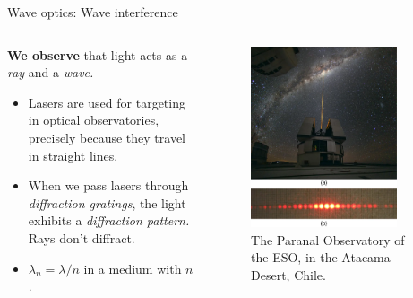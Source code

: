 \documentclass{beamer}
\begin{document}
\begin{frame}{Wave optics: Wave interference}
\begin{columns}[T]
\begin{column}{0.5\textwidth}
\small
\textbf{We observe} that light acts as a \textit{ray} and a \textit{wave.}
\begin{itemize}
\item Lasers are used for targeting in optical observatories, precisely because they travel in straight lines.
\item When we pass lasers through \textit{diffraction gratings}, the light exhibits a \textit{diffraction pattern.} Rays don't diffract.
\item $\lambda_n = \lambda/n$ in a medium with $n$.
\end{itemize}
\end{column}
\begin{column}{0.5\textwidth}
\begin{figure}
\centering
\includegraphics[width=0.85\textwidth]{figures/laser_wave.png}
\caption{\label{fig:laser_wave} \footnotesize The Paranal Observatory of the ESO, in the Atacama Desert, Chile.}
\end{figure}
\end{column}
\end{columns}
\end{frame}
\end{document}
